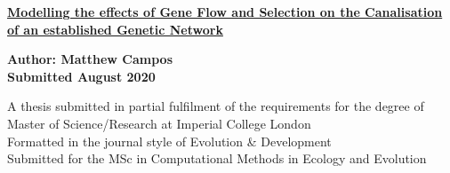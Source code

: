 \begin{titlepage}
    \begin{center}
    \vspace*{1cm}

    \Huge
    \textbf{\underline{Modelling the effects of Gene Flow and Selection on the Canalisation}}\\
    \textbf{\underline{of an established Genetic Network}}\\

    \vspace*{2.0cm}

    \large
    \textbf{Author: Matthew Campos}\\
    \textbf{Submitted August 2020}

    \vspace*{0.8cm}

    \normalsize
    A thesis submitted in partial fulfilment of the requirements for the degree of Master of Science/Research at Imperial College London\\
    Formatted in the journal style of Evolution \& Development\\
    Submitted for the MSc in Computational Methods in Ecology and Evolution\\

    \vspace*{0.8cm}

    \end{center}
\end{titlepage}
